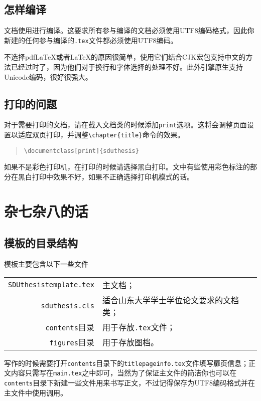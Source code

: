 \section{怎样编译}
\label{section:howtocompile}
文档使用\XeLaTeX{}进行编译。这要求所有参与编译的文档必须使用UTF8编码格式，因此你新建的任何参与编译的\texttt{.tex}文件都必须使用UTF8编码。

不选择pdf\LaTeX{}或者\LaTeX{}的原因很简单，使用它们结合CJK宏包支持中文的方法已经过时了，因为他们对于换行和字体选择的处理不好。此外\XeTeX{}引擎原生支持Unicode编码，很好很强大。
\section{打印的问题}
对于需要打印的文档，请在载入文档类的时候添加\texttt{print}选项。这将会调整页面设置以适应双页打印，并调整\verb|\chapter{title}|命令的效果。
\begin{quote}
\begin{verbatim}
\documentclass[print]{sduthesis}
\end{verbatim}
\end{quote}

如果不是彩色打印机，在打印的时候请选择黑白打印。文中有些使用彩色标注的部分在黑白打印中效果不好，如果不正确选择打印机模式的话。
\chapter{杂七杂八的话}
\section{模板的目录结构}
模板主要包含以下一些文件
\begin{center}
\begin{tabular}
{rl}
\toprule
\texttt{SDUthesistemplate.tex}& 主文档；\\
\texttt{sduthesis.cls}& 适合山东大学学士学位论文要求的文档类；\\
\texttt{contents}目录& 用于存放\texttt{.tex}文件；\\
\texttt{figures}目录& 用于存放图档。\\
\bottomrule
\end{tabular}
\end{center}

写作的时候需要打开\texttt{contents}目录下的\texttt{titlepageinfo.tex}文件填写扉页信息；正文内容只需写在\texttt{main.tex}之中即可，当然为了保证主文件的简洁你也可以在\texttt{contents}目录下新建一些文件用来书写正文，不过记得保存为UTF8编码格式并在主文件中使用\verb||调用。
